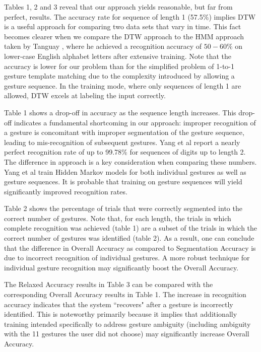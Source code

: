\documentclass[twoside]{article}
\begin{document}
\begin{multicols}{2}
Tables 1, 2 and 3 reveal that our approach yields reasonable, but far from
perfect, results. The accuracy rate for sequence of length 1 (57.5\%) implies
DTW is a useful approach for comparing two data sets that vary in time.
This fact becomes clearer when we compare the DTW approach to the HMM approach
taken by Tanguay \cite{tanguay_jr_hidden_1995}, where he achieved a recognition
accuracy of $50-60\%$ on lower-case English alphabet letters after extensive
training. Note that the accuracy is lower for our problem than for the
simplified problem of 1-to-1 gesture template matching due to the complexity
introduced by allowing a gesture sequence. In the training mode, where only sequences of
length 1 are allowed, DTW excels at labeling the input correctly.

Table 1 shows a drop-off in accuracy as the sequence length increases. This
drop-off indicates a fundamental shortcoming in our approach: improper
recognition of a gesture is concomitant with improper segmentation of the
gesture sequence, leading to mis-recognition of subsequent gestures. Yang et al
\cite{yang_gesture_1994} report a nearly perfect recognition rate of up to
99.78\% for sequences of digits up to length 2. The difference in approach is a
key consideration when comparing these numbers. Yang et al train Hidden Markov
models for both individual gestures as well as gesture sequences. It is probable
that training on gesture sequences will yield significantly improved
recognition rates.

Table 2 shows the percentage of trials that were correctly segmented into the
correct number of gestures. Note that, for each length, the trials in which
complete recognition was achieved (table 1) are a subset of the trials in which
the correct number of gestures was identified (table 2). As a result, one can
conclude that the difference in Overall Accuracy as compared to Segmentation
Accuracy is due to incorrect recognition of individual gestures. A more robust
technique for individual gesture recognition may significantly boost the
Overall Accuracy.

The Relaxed Accuracy results in Table 3 can be compared with the corresponding
Overall Accuracy results in Table 1. The increase in recognition accuracy
indicates that the system ``recovers" after a gesture is incorrectly identified.
This is noteworthy primarily because it implies that additionally training
intended specifically to address gesture ambiguity (including ambiguity with the
11 gestures the user did not choose) may significantly increase Overall
Accuracy.


\end{multicols}
\end{document}
